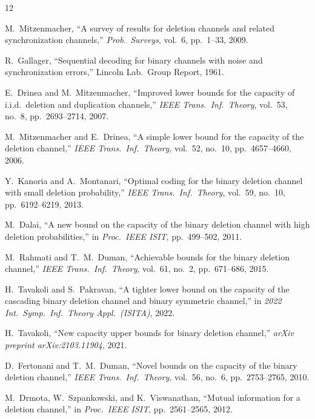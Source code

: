\documentclass[conference]{IEEEtran}
\begin{document}
\begin{thebibliography}{12}

M.~Mitzenmacher,
``A survey of results for deletion channels and related synchronization
channels,''
\textit{Prob.\ Surveys}, vol.~6, pp.~1--33, 2009.

R.~Gallager,
``Sequential decoding for binary channels with noise and
synchronization errors,'' Lincoln Lab.\ Group Report, 1961.

E.~Drinea and M.~Mitzenmacher,
``Improved lower bounds for the capacity of i.i.d.\ deletion and
duplication channels,''
\textit{IEEE Trans.\ Inf.\ Theory}, vol.~53, no.~8, pp.~2693--2714, 2007.

M.~Mitzenmacher and E.~Drinea,
``A simple lower bound for the capacity of the deletion channel,''
\textit{IEEE Trans.\ Inf.\ Theory}, vol.~52, no.~10, pp.~4657--4660, 2006.

Y.~Kanoria and A.~Montanari,
``Optimal coding for the binary deletion channel with small deletion
probability,''
\textit{IEEE Trans.\ Inf.\ Theory}, vol.~59, no.~10, pp.~6192--6219, 2013.

M.~Dalai,
``A new bound on the capacity of the binary deletion channel with high
deletion probabilities,''
in \textit{Proc.\ IEEE ISIT}, pp.~499--502, 2011.

M.~Rahmati and T.~M.~Duman,
``Achievable bounds for the binary deletion channel,''
\textit{IEEE Trans.\ Inf.\ Theory}, vol.~61, no.~2, pp.~671--686, 2015.

H.~Tavakoli and S.~Pakravan,
``A tighter lower bound on the capacity of the cascading binary deletion
channel and binary symmetric channel,''
in \textit{2022 Int.\ Symp.\ Inf.\ Theory Appl.\ (ISITA)}, 2022.

H.~Tavakoli,
``New capacity upper bounds for binary deletion channel,''
\textit{arXiv preprint arXiv:2103.11904}, 2021.

D.~Fertonani and T.~M.~Duman,
``Novel bounds on the capacity of the binary deletion channel,''
\textit{IEEE Trans.\ Inf.\ Theory}, vol.~56, no.~6, pp.~2753--2765, 2010.

M.~Drmota, W.~Szpankowski, and K.~Viswanathan,
``Mutual information for a deletion channel,''
in \textit{Proc.\ IEEE ISIT}, pp.~2561--2565, 2012.


\end{thebibliography}
\end{document}

